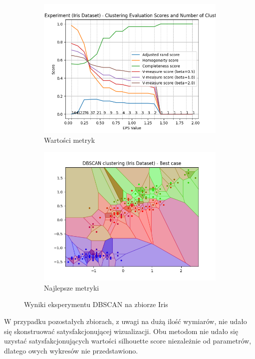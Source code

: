 \documentclass[12pt]{article}
\begin{document}
\begin{figure}[H]
\begin{subfigure}[t]{0.24\textwidth}
        \includegraphics[width=\linewidth]{img/other_datasets/iris_dbscan_scores.png}
        \caption{Wartości metryk}
    \end{subfigure}
    \begin{subfigure}[t]{0.24\textwidth}
        \includegraphics[width=\linewidth]{img/other_datasets/iris_dbscan_best.png}
        \caption{Najlepsze metryki}
    \end{subfigure}
    \caption{Wyniki eksperymentu DBSCAN na zbiorze Iris}
\end{figure}

W przypadku pozostałych zbiorach, z uwagi na dużą ilość wymiarów, nie udało się skonstruować satysfakcjonującej wizualizacji.
Obu metodom nie udało się uzystać satysfakcjonujących wartości silhouette score niezależnie od parametrów, dlatego owych wykresów nie przedstawiono.
\end{document}
